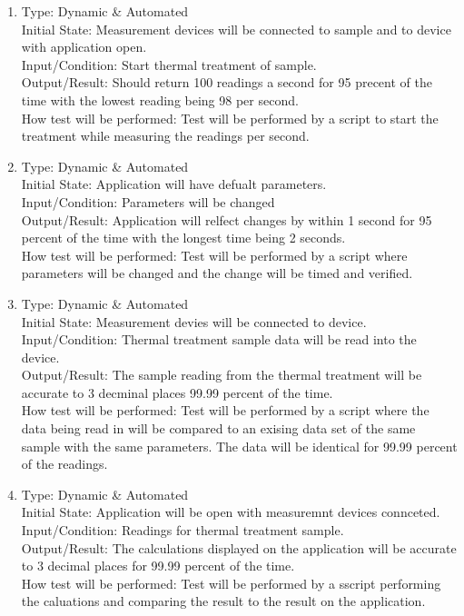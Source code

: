 \documentclass[12pt, titlepage]{article}
\begin{document}
\begin{adjustwidth}{2.2em}{0pt}
\begin{enumerate}[{NF-PT}1.]
    \item Type: Dynamic \& Automated\\
    Initial State: Measurement devices will be connected to sample and to device with application open.\\
    Input/Condition: Start thermal treatment of sample.\\
    Output/Result: Should return 100 readings a second for 95 precent of the time with the lowest reading being 98 per second.\\
    How test will be performed: Test will be performed by a script to start the treatment while measuring the readings per second. 
    
    \item Type: Dynamic \& Automated\\
    Initial State: Application will have defualt parameters.\\
    Input/Condition: Parameters will be changed\\
    Output/Result: Application will relfect changes by within 1 second for 95 percent of the time with the longest time being 2 seconds.\\
    How test will be performed: Test will be performed by a script where parameters will be changed and the change will be timed and verified.

    \item Type: Dynamic \& Automated\\
    Initial State: Measurement devies will be connected to device.\\
    Input/Condition: Thermal treatment sample data will be read into the device.\\
    Output/Result: The sample reading from the thermal treatment will be accurate to 3 decminal places 99.99 percent of the time.\\
    How test will be performed: Test will be performed by a script where the data being read in will be compared to an exising data set of the same sample with the same parameters. The data will be identical for 99.99 percent of the readings.

    \item Type: Dynamic \& Automated\\
    Initial State: Application will be open with measuremnt devices connceted.\\
    Input/Condition: Readings for thermal treatment sample.\\
    Output/Result: The calculations displayed on the application will be accurate to 3 decimal places for 99.99 percent of the time.\\
    How test will be performed: Test will be performed by a sscript performing the caluations and comparing the result to the result on the application.


\end{enumerate}
\end{adjustwidth}
\end{document}
